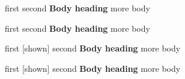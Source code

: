 
\begin{mixed}
{first}
{second}
{\bfseries Body heading}
more body
\end{mixed}

\begin{mixed}
[shown]
{first}
{second}
{\bfseries Body heading}
more body
\end{mixed}

\begin{mixed}
{first}
[shown]
{second}
{\bfseries Body heading}
more body
\end{mixed}

\begin{mixed}
[shown]
{first}
[shown]
{second}
{\bfseries Body heading}
more body
\end{mixed}
